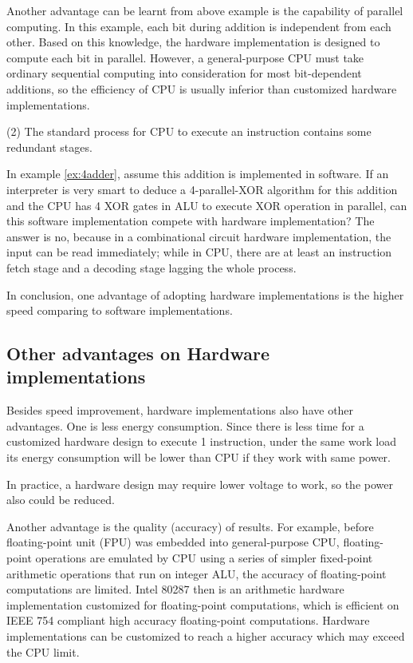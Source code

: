 \documentclass[11pt,twoside, onecolumn]{IEEEtran}
\begin{document}
Another advantage can be learnt from above example is the capability of parallel computing.
In this example, each bit during addition is independent from each other. Based on this 
knowledge, the hardware implementation is designed to compute each bit in parallel.
However, a general-purpose CPU must take ordinary sequential computing into consideration
for most bit-dependent additions, so the efficiency of CPU is usually inferior than customized
hardware implementations.

(2) The standard process for CPU to execute an instruction contains some redundant stages.

In example \ref{ex:4adder}, assume this addition is implemented in software. 
If an interpreter is very smart to deduce a 4-parallel-XOR algorithm for this addition 
and the CPU has 4 XOR gates in ALU to execute XOR operation in parallel, can this software 
implementation compete with hardware implementation? The answer is no, because in a combinational
circuit hardware implementation, the input can be read immediately; while in CPU,
there are at least an instruction fetch stage and a decoding stage lagging the whole process.

In conclusion, one advantage of adopting hardware implementations is the higher speed comparing to
software implementations.

\subsection{Other advantages on Hardware implementations}
Besides speed improvement, hardware implementations also have other advantages.
One is less energy consumption. Since there is less time for a customized hardware
design to execute 1 instruction, under the same work load its energy consumption
will be lower than CPU if they work with same power.

In practice, a hardware design may require lower voltage to work, so the power
also could be reduced.

Another advantage is the quality (accuracy) of results. For example, before floating-point unit
(FPU) was embedded into general-purpose CPU, floating-point operations are emulated by CPU 
using a series of simpler fixed-point arithmetic operations that run on integer ALU, the 
accuracy of floating-point computations are limited. Intel 80287 then is an arithmetic hardware
implementation customized for floating-point computations, which is efficient on IEEE 754 compliant
high accuracy floating-point computations. Hardware implementations can be customized to reach 
a higher accuracy which may exceed the CPU limit.
\end{document}
